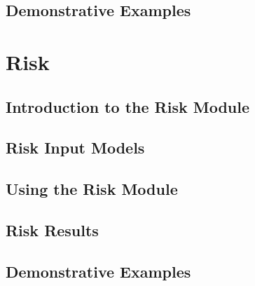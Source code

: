 \documentclass[11pt,fleqn]{book} %
\begin{document}
\chapter{Demonstrative Examples}
	\label{chap:hazdemos}
	
   \cleardoublepage

\thispagestyle{empty}
\part{Risk}

\chapter{Introduction to the Risk Module}
   \label{chap:riskintro}
	
   \cleardoublepage

\chapter{Risk Input Models}
   \label{chap:riskinputs}
   
   \cleardoublepage

\chapter{Using the Risk Module}
	\label{chap:riskcalculators}
	
   \cleardoublepage

\chapter{Risk Results}
	\label{chap:riskoutputs}
	
   \cleardoublepage

\chapter{Demonstrative Examples}
	\label{chap:riskdemos}
	
   \cleardoublepage

%
%	
\end{document}
